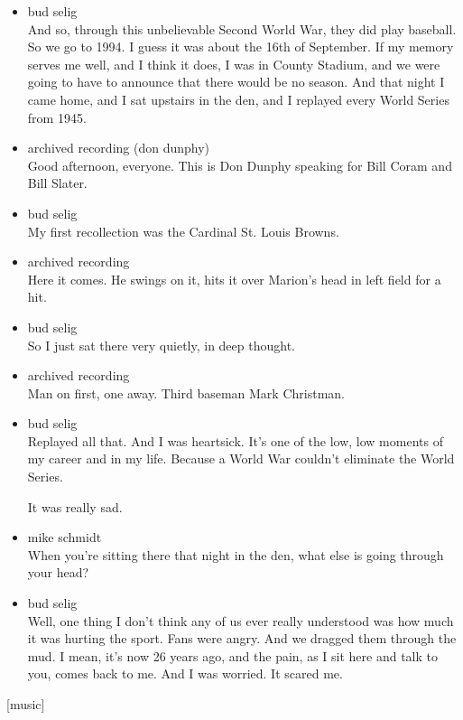 \begin{itemize}
\item
  bud selig\\
  And so, through this unbelievable Second World War, they did play
  baseball. So we go to 1994. I guess it was about the 16th of
  September. If my memory serves me well, and I think it does, I was in
  County Stadium, and we were going to have to announce that there would
  be no season. And that night I came home, and I sat upstairs in the
  den, and I replayed every World Series from 1945.
\item
  archived recording (don dunphy)\\
  Good afternoon, everyone. This is Don Dunphy speaking for Bill Coram
  and Bill Slater.
\item
  bud selig\\
  My first recollection was the Cardinal St. Louis Browns.
\item
  archived recording\\
  Here it comes. He swings on it, hits it over Marion's head in left
  field for a hit.
\item
  bud selig\\
  So I just sat there very quietly, in deep thought.
\item
  archived recording\\
  Man on first, one away. Third baseman Mark Christman.
\item
  bud selig\\
  Replayed all that. And I was heartsick. It's one of the low, low
  moments of my career and in my life. Because a World War couldn't
  eliminate the World Series.

  It was really sad.
\item
  mike schmidt\\
  When you're sitting there that night in the den, what else is going
  through your head?
\item
  bud selig\\
  Well, one thing I don't think any of us ever really understood was how
  much it was hurting the sport. Fans were angry. And we dragged them
  through the mud. I mean, it's now 26 years ago, and the pain, as I sit
  here and talk to you, comes back to me. And I was worried. It scared
  me.
\end{itemize}

{[}music{]}

